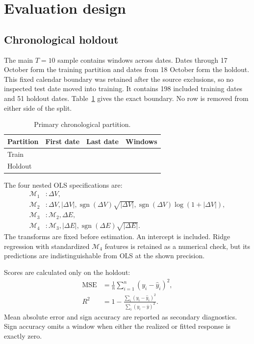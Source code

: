 \documentclass[11pt,a4paper]{article}
\begin{document}
\section{Evaluation design}

\subsection{Chronological holdout}

The main $T=10$ sample contains \TenOrderWindows{} windows across \Sessions{}
dates. Dates through 17 October form the training partition and dates from
18 October form the holdout. This fixed calendar boundary was retained after
the source exclusions, so no inspected test date moved into training. It
contains 198 included training dates and 51 holdout dates.
Table~\ref{tab:split} gives the exact boundary. No row is removed from either
side of the split.

\begin{table}[H]
  \centering
  \caption{Primary chronological partition.}
  \label{tab:split}
  \begin{tabular}{lll r}
    \toprule
    Partition & First date & Last date & Windows \\
    \midrule
    Train & \TrainFirstDate{} & \TrainLastDate{} & \TrainObservations{} \\
    Holdout & \TestFirstDate{} & \TestLastDate{} & \TestObservations{} \\
    \bottomrule
  \end{tabular}
\end{table}

The four nested OLS specifications are:
\begin{align*}
  \mathcal{M}_1 &: \Delta V, \\
  \mathcal{M}_2 &: \Delta V, |\Delta V|,
    \operatorname{sgn}(\Delta V)\sqrt{|\Delta V|},
    \operatorname{sgn}(\Delta V)\log(1+|\Delta V|), \\
  \mathcal{M}_3 &: \mathcal{M}_2, \Delta E, \\
  \mathcal{M}_4 &: \mathcal{M}_3, |\Delta E|,
    \operatorname{sgn}(\Delta E)\sqrt{|\Delta E|}.
\end{align*}
The transforms are fixed before estimation. An intercept is included. Ridge
regression with standardized $\mathcal{M}_4$ features is retained as a numerical
check, but its predictions are indistinguishable from OLS at the shown
precision.

Scores are calculated only on the holdout:
\begin{align}
  \operatorname{MSE} &= \frac{1}{n}\sum_{i=1}^{n}(y_i-\hat y_i)^2, \\
  R^2 &= 1-\frac{\sum_i(y_i-\hat y_i)^2}
                   {\sum_i(y_i-\bar y)^2}.
\end{align}
Mean absolute error and sign accuracy are reported as secondary diagnostics.
Sign accuracy omits a window when either the realized or fitted response is
exactly zero.
\end{document}
